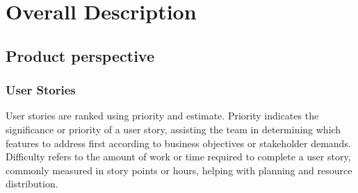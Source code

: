 \documentclass{article}
\begin{document}
\newpage

\section{Overall Description}

\subsection{Product perspective}

\subsubsection{User Stories}

User stories are ranked using priority and estimate. Priority 
indicates the significance or priority of a user story, assisting the team in determining which features to address first according to business objectives or stakeholder demands. Difficulty 
refers to the amount of work or time required to complete a user story, commonly measured in story points or hours, helping with planning and resource distribution.
\end{document}
